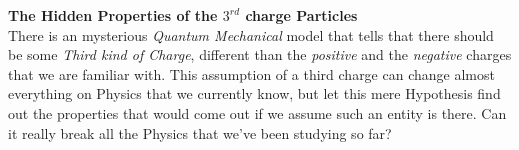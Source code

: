 \documentclass[11pt,a4paper]{article}
\author{AS}
\begin{document}
\textbf{The Hidden Properties of the $3^{rd}$ charge Particles}
\\
There is an mysterious \emph{Quantum Mechanical} model that tells that there should be some \emph{Third kind of Charge}, different than the \emph{positive} and the \emph{negative} charges that we are familiar with. This assumption of a third charge can change almost everything on Physics that we currently know, but let this mere Hypothesis find out the properties that would come out if we assume such an entity is there. Can it really break all the Physics that we've been studying so far?

\end{document}
